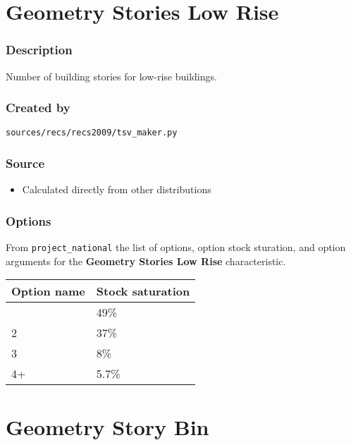 \section{Geometry Stories Low Rise}\label{geometry_stories_low_rise}

\subsubsection{Description}\label{description-58}

Number of building stories for low-rise buildings.

\subsubsection{Created by}\label{created-by-58}

\texttt{sources/recs/recs2009/tsv\_maker.py}

\subsubsection{Source}\label{source-57}

\begin{itemize}
 
\item
  Calculated directly from other distributions
\end{itemize}

\subsubsection{Options}\label{options-58}

From \texttt{project\_national} the list of options, option stock
sturation, and option arguments for the \textbf{Geometry Stories Low
Rise} characteristic.

\begin{longtable}[]{@{}ll@{}}
\toprule\noalign{}
Option name & Stock saturation \\
\midrule\noalign{}
\endhead
\bottomrule\noalign{}
\endlastfoot
1 & 49\% \\
2 & 37\% \\
3 & 8\% \\
4+ & 5.7\% \\
\end{longtable}

\section{Geometry Story Bin}\label{geometry_story_bin}

